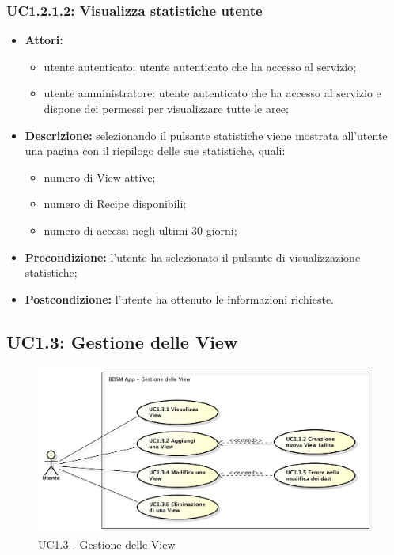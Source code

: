 \subsubsection{UC1.2.1.2: Visualizza statistiche utente}

\begin{itemize}
    \item \textbf{Attori:}
    \begin{itemize}
        \item utente autenticato: utente autenticato che ha accesso al servizio;
        \item utente amministratore: utente autenticato che ha accesso al servizio e dispone dei permessi per visualizzare tutte le aree;
    \end{itemize}
    \item \textbf{Descrizione:} selezionando il pulsante statistiche viene mostrata all'utente una pagina con il riepilogo delle sue statistiche, quali:
    \begin{itemize}
        \item numero di View attive;
        \item numero di Recipe disponibili;
        \item numero di accessi negli ultimi 30 giorni;
    \end{itemize}
    \item \textbf{Precondizione:} l'utente ha selezionato il pulsante di visualizzazione statistiche;
    \item \textbf{Postcondizione:} l'utente ha ottenuto le informazioni richieste.
\end{itemize}

\pagebreak
\subsection{UC1.3: Gestione delle View}

\begin{figure}[!htbp]
    \centering
    \centerline{\includegraphics[scale=0.45]{./images/UC1_3.pdf}}
    \caption{UC1.3 - Gestione delle View}
\end{figure}

